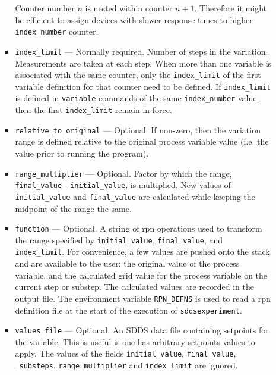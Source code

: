 \begin{itemize}
\begin{itemize}
\begin{itemize}
                Counter number $n$ is nested within counter $n+1$. Therefore it might be efficient
                to assign devices with slower response times to
                higher \verb+index_number+ counter.
        \item {\verb+index_limit+} --- Normally required. 
                Number of steps in the variation. Measurements are taken at each step. 
                When more than one variable is associated with the same counter, only the {\verb+index_limit+}
                of the first variable definition for that counter need to be defined.
                If {\verb+index_limit+} is defined in {\verb+variable+} commands
                of the same  {\verb+index_number+} value, then the first {\verb+index_limit+}
                remain in force.
        \item {\verb+relative_to_original+} --- Optional. If non-zero, then the variation range is defined 
                relative to the original process variable value (i.e. the value prior to running the program).
        \item {\verb+range_multiplier+} --- Optional. Factor by which the range, {\verb+final_value+} - {\verb+initial_value+}, is multiplied.
                New values of {\verb+initial_value+} and {\verb+final_value+} are calculated while keeping the midpoint of
                the range the same.
        \item {\verb+function+} --- Optional. A string of rpn operations used to transform the range specified 
                by {\verb+initial_value+}, {\verb+final_value+}, and {\verb+index_limit+}. 
                For convenience, a few values are pushed onto the stack and are available
                to the user: the original value of the process variable, and the 
                calculated grid value for the process variable on the current step or substep. 
                The calculated values are
                recorded in the output file. The environment variable \verb+RPN_DEFNS+
                is used to read a rpn definition file at the start of the execution of \verb+sddsexperiment+.
        \item {\verb+values_file+} --- Optional. An SDDS data file containing setpoints for the variable.
                This is useful is one has arbitrary setpoints values to apply.
                The values of the fields {\verb+initial_value+}, {\verb+final_value+}, {\verb+_substeps+}, 
                {\verb+range_multiplier+} and {\verb+index_limit+} are ignored. 


\end{itemize}
\end{itemize}
\end{itemize}
